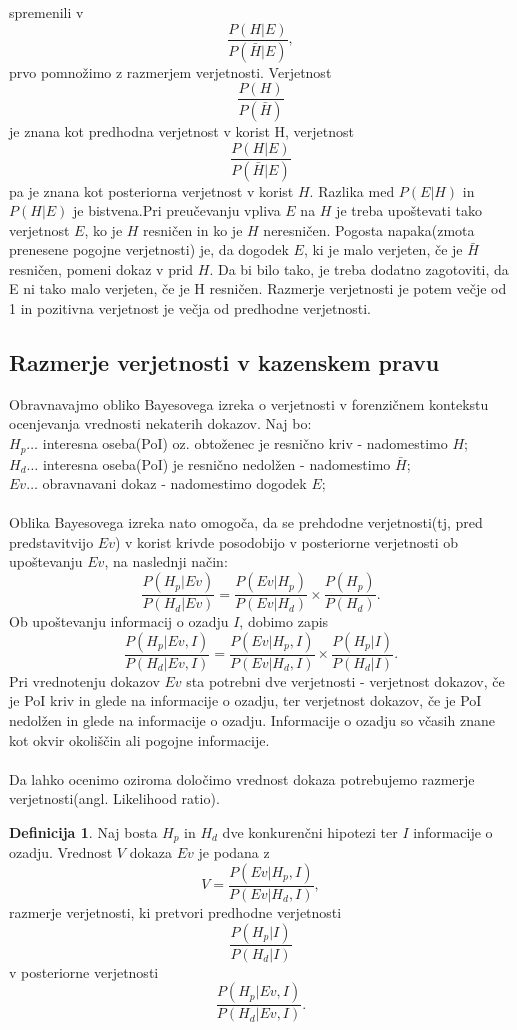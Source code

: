 \documentclass[12pt,a4paper]{amsart}
\theoremstyle{definition} %
\newtheorem{definicija}{Definicija}[section]
\theoremstyle{plain} %
\begin{document}
spremenili v 
\[
    \frac{P(H \lvert E)}{P(\bar{H} \lvert E)},
\] 
prvo pomnožimo z razmerjem verjetnosti. Verjetnost 
\[
    \frac{P(H)}{P(\bar{H})}
\]
je znana kot predhodna verjetnost v korist H, verjetnost 
\[
    \frac{P(H \lvert E)}{P(\bar{H} \lvert E)} 
\]
pa je znana kot posteriorna verjetnost v korist $H$. Razlika med $P(E \lvert H)$ in $P(H \lvert E)$ je bistvena.Pri preučevanju vpliva 
$E$ na $H$ je treba upoštevati tako verjetnost $E$, ko je $H$ resničen in ko je $H$ neresničen. Pogosta napaka(zmota prenesene pogojne 
verjetnosti) je, da dogodek $E$, ki je malo verjeten, če je $\bar{H}$ resničen, pomeni dokaz v prid $H$. Da bi bilo tako, je treba dodatno 
zagotoviti, da E ni tako malo verjeten, če je H resničen. Razmerje verjetnosti je potem večje od 1 in pozitivna verjetnost je večja od 
predhodne verjetnosti.

\subsection{Razmerje verjetnosti v kazenskem pravu}
Obravnavajmo obliko Bayesovega izreka o verjetnosti v forenzičnem kontekstu ocenjevanja vrednosti nekaterih dokazov. Naj bo:\\
$H_p \dots$ interesna oseba(PoI) oz. obtoženec je resnično kriv - nadomestimo $H$;\\
$H_d \dots$ interesna oseba(PoI) je resnično nedolžen - nadomestimo $\bar{H}$;\\
$Ev \dots$ obravnavani dokaz - nadomestimo dogodek $E$;\\\\
Oblika Bayesovega izreka nato omogoča, da se prehdodne verjetnosti(tj, pred predstavitvijo $Ev$) v korist krivde posodobijo v posteriorne 
verjetnosti ob upoštevanju $Ev$, na naslednji način:
\[
    \frac{P(H_p \lvert Ev)}{P(H_d \lvert Ev)} = \frac{P(Ev \lvert H_p)}{P(Ev \lvert H_d)} \times \frac{P(H_p)}{P(H_d)}.
\]
Ob upoštevanju informacij o ozadju $I$, dobimo zapis
\[
    \frac{P(H_p \lvert Ev, I)}{P(H_d \lvert Ev, I)} = \frac{P(Ev \lvert H_p, I)}{P(Ev \lvert H_d, I)} \times \frac{P(H_p \lvert I)}{P(H_d \lvert I)}.
\]
Pri vrednotenju dokazov $Ev$ sta potrebni dve verjetnosti - verjetnost dokazov, če je PoI kriv in glede na informacije o ozadju, ter 
verjetnost dokazov, če je PoI nedolžen in glede na informacije o ozadju. Informacije o ozadju so včasih znane kot okvir okoliščin 
ali pogojne informacije. \\\\
Da lahko ocenimo oziroma določimo vrednost dokaza potrebujemo razmerje verjetnosti(angl. Likelihood ratio).
\begin{definicija}
    Naj bosta  $H_p$ in $H_d$ dve konkurenčni hipotezi ter $I$ informacije o ozadju. Vrednost $V$ dokaza $Ev$ je podana z 
    \[
        V = \frac{P(Ev \lvert H_p, I)}{P(Ev \lvert H_d, I)},
    \]
    razmerje verjetnosti, ki pretvori predhodne verjetnosti 
    \[
        \frac{P(H_p \lvert I)}{P(H_d \lvert I)}
    \]
    v posteriorne verjetnosti 
    \[
        \frac{P(H_p \lvert Ev, I)}{P(H_d \lvert Ev, I)}.
    \]
\end{definicija}
\end{document}
